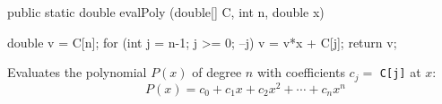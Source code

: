\begin{code}

   public static double evalPoly (double[] C, int n, double x) \begin{hide} {
      double v = C[n];
      for (int j = n-1; j >= 0; --j)
         v = v*x + C[j];
      return v;
   }\end{hide}
\end{code}
\begin{tabb} Evaluates the polynomial $P(x)$
of degree $n$ with coefficients $c_j =$ \texttt{C[j]} at $x$:
\begin{equation}
\qquad  P(x) = c_0 + c_1 x + c_2 x^2 + \cdots + c_n x^n  \label{eq.horner}
\end{equation}
\end{tabb}
\begin{htmlonly}
\end{htmlonly}

\begin{code}\begin{hide}
}\end{hide}
\end{code}
